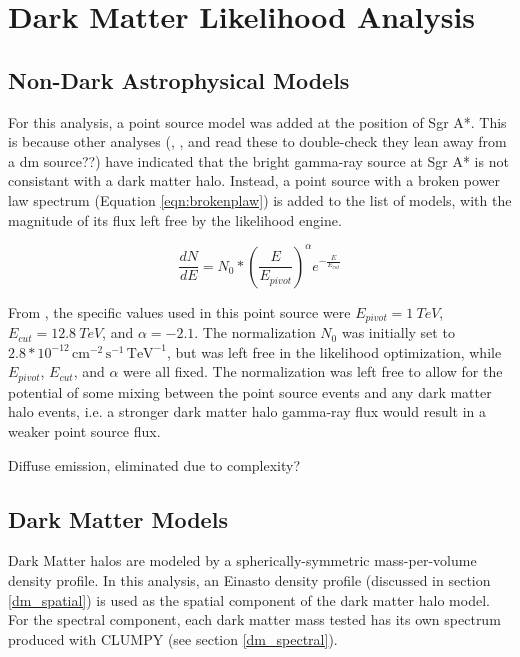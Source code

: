 \section{Dark Matter Likelihood Analysis}
  
  \subsection{Non-Dark Astrophysical Models}
  For this analysis, a point source model was added at the position of Sgr A*.
  This is because other analyses (\cite{gc_pnt_is_not_dm1}, \cite{gc_pnt_is_not_dm2}, and \cite{gc_pnt_is_not_dm3} {\color{red}read these to double-check they lean away from a dm source??}) have indicated that the bright gamma-ray source at Sgr A* is not consistant with a dark matter halo.
  Instead, a point source with a broken power law spectrum (Equation \ref{eqn:brokenplaw}) is added to the list of models, with the magnitude of its flux left free by the likelihood engine.
  
  \begin{equation}\label{eqn:brokenplaw}
    \frac{dN}{dE} = N_{0} * { \left ( \frac{E}{E_{pivot}} \right ) }^{\alpha} {e}^{-\frac{E}{E_{cut}}}
  \end{equation}
  
  From \cite{VeritasGCRidge2015}, the specific values used in this point source were $E_{pivot}=\SI{1}{TeV}$, $E_{cut}=\SI{12.8}{TeV}$, and $\alpha=-2.1$.
  The normalization $N_{0}$ was initially set to $2.8*{10}^{-12}\,\text{cm}^{-2}\,\text{s}^{-1}\,\text{TeV}^{-1}$, but was left free in the likelihood optimization, while $E_{pivot}$, $E_{cut}$, and $\alpha$ were all fixed.
  The normalization was left free to allow for the potential of some mixing between the point source events and any dark matter halo events, i.e. a stronger dark matter halo gamma-ray flux would result in a weaker point source flux.
  
  Diffuse emission, eliminated due to complexity?

  \subsection{Dark Matter Models}
  Dark Matter halos are modeled by a spherically-symmetric mass-per-volume density profile.
  In this analysis, an Einasto density profile (discussed in section \ref{dm_spatial}) is used as the spatial component of the dark matter halo model.
  For the spectral component, each dark matter mass tested has its own spectrum produced with CLUMPY (see section \ref{dm_spectral}).

